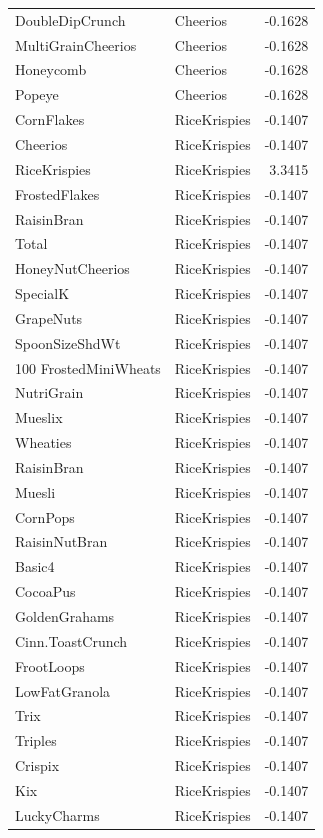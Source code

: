 \begin{longtable}{llr}
DoubleDipCrunch & Cheerios & -0.1628 \\
MultiGrainCheerios & Cheerios & -0.1628 \\
Honeycomb & Cheerios & -0.1628 \\
Popeye & Cheerios & -0.1628 \\
CornFlakes & RiceKrispies & -0.1407 \\
Cheerios & RiceKrispies & -0.1407 \\
RiceKrispies & RiceKrispies & 3.3415 \\
FrostedFlakes & RiceKrispies & -0.1407 \\
RaisinBran & RiceKrispies & -0.1407 \\
Total & RiceKrispies & -0.1407 \\
HoneyNutCheerios & RiceKrispies & -0.1407 \\
SpecialK & RiceKrispies & -0.1407 \\
GrapeNuts & RiceKrispies & -0.1407 \\
SpoonSizeShdWt & RiceKrispies & -0.1407 \\
100%
FrostedMiniWheats & RiceKrispies & -0.1407 \\
NutriGrain & RiceKrispies & -0.1407 \\
Mueslix & RiceKrispies & -0.1407 \\
Wheaties & RiceKrispies & -0.1407 \\
RaisinBran & RiceKrispies & -0.1407 \\
Muesli & RiceKrispies & -0.1407 \\
CornPops & RiceKrispies & -0.1407 \\
RaisinNutBran & RiceKrispies & -0.1407 \\
Basic4 & RiceKrispies & -0.1407 \\
CocoaPus & RiceKrispies & -0.1407 \\
GoldenGrahams & RiceKrispies & -0.1407 \\
Cinn.ToastCrunch & RiceKrispies & -0.1407 \\
FrootLoops & RiceKrispies & -0.1407 \\
LowFatGranola & RiceKrispies & -0.1407 \\
Trix & RiceKrispies & -0.1407 \\
Triples & RiceKrispies & -0.1407 \\
Crispix & RiceKrispies & -0.1407 \\
Kix & RiceKrispies & -0.1407 \\
LuckyCharms & RiceKrispies & -0.1407 \\

\end{longtable}
